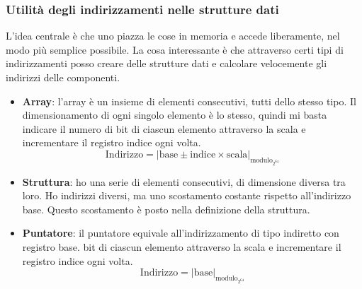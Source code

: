 \documentclass[11pt]{report}
\theoremstyle{definition}
\begin{document}
\subsubsection{Utilità degli indirizzamenti nelle strutture dati} L'idea centrale è che uno piazza le cose in memoria e accede liberamente, nel modo più semplice possibile. La cosa interessante è che attraverso certi tipi di indirizzamenti posso creare delle strutture dati e calcolare velocemente gli indirizzi delle componenti.
\begin{itemize}
\item \textbf{Array}: l'array è un insieme di elementi consecutivi, tutti dello stesso tipo. Il dimensionamento di ogni singolo elemento è lo stesso, quindi mi basta indicare il numero di bit di ciascun elemento attraverso la scala e incrementare il registro indice ogni volta.
\[\text{Indirizzo}=\left|\text{base} \pm \text{indice} \times \text{scala}\right|_{\text{modulo}_{2^{64}}}\]
\item \textbf{Struttura}: ho una serie di elementi consecutivi, di dimensione diversa tra loro. Ho indirizzi diversi, ma uno scostamento costante rispetto all'indirizzo base. Questo scostamento è posto nella definizione della struttura.
\item \textbf{Puntatore}: il puntatore equivale all'indirizzamento di tipo indiretto con registro base. bit di ciascun elemento attraverso la scala e incrementare il registro indice ogni volta.
\[\text{Indirizzo}=\left|\text{base}\right|_{\text{modulo}_{2^{64}}}\]
\end{itemize}
\clearpage 
\end{document}
